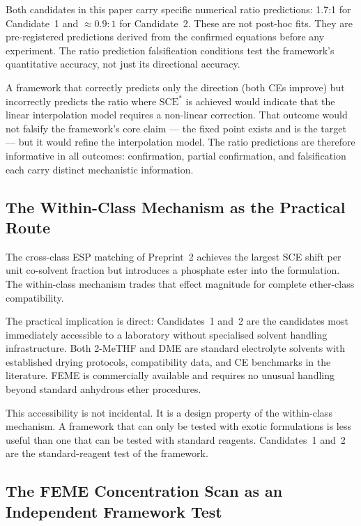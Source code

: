 \documentclass[11pt]{article}
\theoremstyle{plain}
\theoremstyle{definition}
\theoremstyle{remark}
\begin{document}
Both candidates in this paper carry specific numerical ratio
predictions: 1.7:1 for Candidate~1 and $\approx 0.9:1$ for
Candidate~2.  These are not post-hoc fits.  They are pre-registered
predictions derived from the confirmed equations before any
experiment.  The ratio prediction falsification conditions test the
framework's quantitative accuracy, not just its directional accuracy.

A framework that correctly predicts only the direction (both CEs
improve) but incorrectly predicts the ratio where $\mathrm{SCE}^{*}$
is achieved would indicate that the linear interpolation model
requires a non-linear correction.  That outcome would not falsify the
framework's core claim --- the fixed point exists and is the
target --- but it would refine the interpolation model.  The ratio
predictions are therefore informative in all outcomes: confirmation,
partial confirmation, and falsification each carry distinct
mechanistic information.

\subsection{The Within-Class Mechanism as the Practical Route}

The cross-class ESP matching of Preprint~2 achieves the largest SCE
shift per unit co-solvent fraction but introduces a phosphate ester
into the formulation.  The within-class mechanism trades that effect
magnitude for complete ether-class compatibility.

The practical implication is direct: Candidates~1 and~2 are the
candidates most immediately accessible to a laboratory without
specialised solvent handling infrastructure.  Both 2-MeTHF and DME
are standard electrolyte solvents with established drying protocols,
compatibility data, and CE benchmarks in the literature.  FEME is
commercially available and requires no unusual handling beyond
standard anhydrous ether procedures.

This accessibility is not incidental.  It is a design property of
the within-class mechanism.  A framework that can only be tested
with exotic formulations is less useful than one that can be tested
with standard reagents.  Candidates~1 and~2 are the standard-reagent
test of the framework.

\subsection{The FEME Concentration Scan as an Independent Framework Test}
\end{document}
